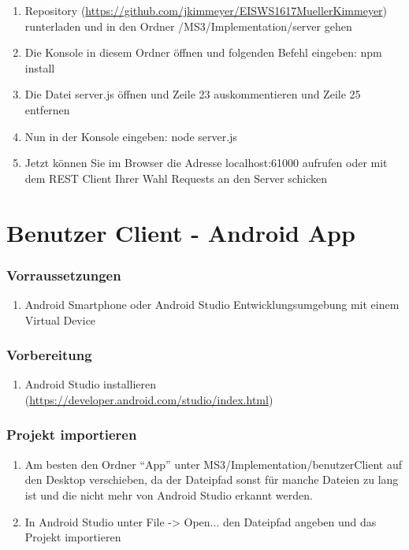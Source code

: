 \begin{enumerate}
\item Repository (\url{https://github.com/jkimmeyer/EISWS1617MuellerKimmeyer}) runterladen und in den Ordner /MS3/Implementation/server gehen
\item Die Konsole in diesem Ordner öffnen und folgenden Befehl eingeben: npm install
\item Die Datei server.js öffnen und Zeile 23 auskommentieren und Zeile 25 entfernen
\item Nun in der Konsole eingeben: node server.js
\item Jetzt können Sie im Browser die Adresse localhost:61000 aufrufen oder mit dem REST Client Ihrer Wahl Requests an den Server schicken
\end{enumerate}

\section{Benutzer Client - Android App}

\subsubsection{Vorraussetzungen}

\begin{enumerate}
\item Android Smartphone oder Android Studio Entwicklungsumgebung mit einem Virtual Device
\end{enumerate}

\subsubsection{Vorbereitung}

\begin{enumerate}
\item Android Studio installieren (\url{https://developer.android.com/studio/index.html})
\end{enumerate}

\subsubsection{Projekt importieren}

\begin{enumerate}
\item Am besten den Ordner ``App'' unter MS3/Implementation/benutzerClient auf den Desktop verschieben, da der Dateipfad sonst für manche Dateien zu lang ist und die nicht mehr von Android Studio erkannt werden.
\item In Android Studio unter File -> Open... den Dateipfad angeben und das Projekt importieren
\end{enumerate}

